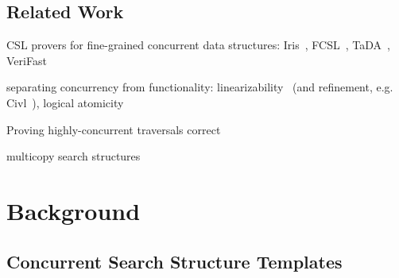 \documentclass[a4paper,UKenglish,cleveref, autoref, thm-restate]{lipics-v2021}
\begin{document}
\subsection*{Related Work}
CSL provers for fine-grained concurrent data structures: Iris~\cite{iris,iris-folly}, FCSL~\cite{fcsl}, TaDA~\cite{tada,Xiong2017Abstract}, VeriFast~\cite{verifast,verifast-conc}



separating concurrency from functionality: linearizability~\cite{linearizability} (and refinement, e.g. Civl~\cite{civl}), logical atomicity~\cite{tada}

Proving highly-concurrent traversals correct \cite{feldman2020proving}

multicopy search structures~\cite{template-multi}

\section{Background}
\subsection{Concurrent Search Structure Templates}
\end{document}
